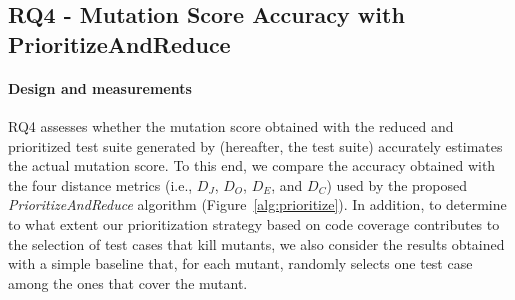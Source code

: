 %
%
%


\subsection{RQ4 - Mutation Score Accuracy with PrioritizeAndReduce}
\label{exp:accuracy:prioritize}

\paragraph{Design and measurements}


RQ4 assesses whether the mutation score obtained with the reduced and prioritized test suite generated by \APPR (hereafter, the \APPR test suite) accurately estimates the actual mutation  score.
To this end, we compare the accuracy obtained with the four distance metrics (i.e., $D_J$, $D_O$, $D_E$, and $D_C$) used by the proposed \emph{PrioritizeAndReduce} algorithm (Figure~\ref{alg:prioritize}). In addition, to determine to what extent our prioritization strategy based on code coverage contributes to the selection of test cases that kill mutants, we also consider the results obtained with a simple baseline that, for each mutant, randomly selects one test case among the ones that cover the mutant. 


